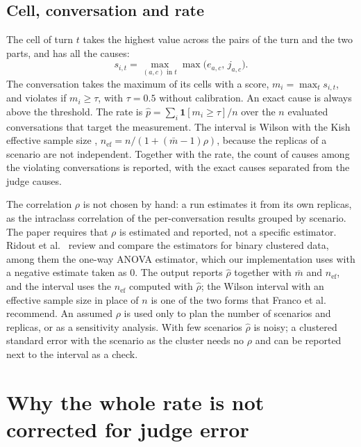 \documentclass[11pt,a4paper]{article}
\begin{document}
\subsection{Cell, conversation and rate}

The cell of turn $t$ takes the highest value across the pairs of the turn and the two parts, and has all the
causes:
\begin{equation}
  s_{i,t} = \max_{(a,c) \text{ in } t} \max\big(e_{a,c},\, j_{a,c}\big).
\end{equation}
The conversation takes the maximum of its cells with a score, $m_i = \max_t s_{i,t}$, and violates if
$m_i \geq \tau$, with $\tau = 0.5$ without calibration. An exact cause is always above the threshold. The rate is
$\hat{p} = \sum_i \mathbf{1}[m_i \geq \tau] / n$ over the $n$ evaluated conversations that target the
measurement. The interval is Wilson \cite{wilson1927,brown2001} with the Kish effective sample size
\cite{kish1965}, $n_{\mathrm{ef}} = n / (1 + (\bar{m} - 1)\rho)$, because the replicas of a scenario are not
independent. Together with the rate, the count of causes among the violating conversations is reported, with
the exact causes separated from the judge causes.

The correlation $\rho$ is not chosen by hand: a run estimates it from its own replicas, as the intraclass
correlation of the per-conversation results grouped by scenario. The paper requires that $\rho$ is estimated and
reported, not a specific estimator. Ridout et al.~\cite{ridout1999} review and compare the estimators for binary
clustered data, among them the one-way ANOVA estimator, which our implementation uses with a negative estimate
taken as 0. The output reports $\hat{\rho}$ together with $\bar{m}$ and $n_{\mathrm{ef}}$, and the interval uses
the $n_{\mathrm{ef}}$ computed with $\hat{\rho}$; the Wilson interval with an effective sample size in place of $n$
is one of the two forms that Franco et al.~\cite{franco2019} recommend. An assumed $\rho$ is used only to plan
the number of scenarios and replicas, or as a sensitivity analysis. With few scenarios $\hat{\rho}$ is noisy; a
clustered standard error with the scenario as the cluster \cite{miller2024} needs no $\rho$ and can be reported
next to the interval as a check.

\section{Why the whole rate is not corrected for judge error}
\label{sec:rg}
\end{document}
